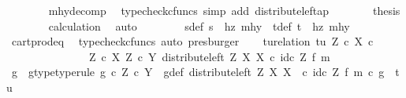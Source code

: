 \begin{isabellebody}
\ \ \ \ \ \ \isamarkupfalse%
\ mhy{\isacharunderscore}{\kern0pt}decomp\ \isamarkupfalse%
\ {\isacharparenleft}{\kern0pt}typecheck{\isacharunderscore}{\kern0pt}cfuncs{\isacharcomma}{\kern0pt}\ simp\ add{\isacharcolon}{\kern0pt}\ distribute{\isacharunderscore}{\kern0pt}left{\isacharunderscore}{\kern0pt}ap{\isacharparenright}{\kern0pt}\isanewline
\ \ \ \ \isamarkupfalse%
\ \isamarkupfalse%
\ {\isacharquery}{\kern0pt}thesis\isanewline
\ \ \ \ \ \ \isamarkupfalse%
\ calculation\ \isamarkupfalse%
\ auto\isanewline
\ \ \isamarkupfalse%
\isanewline
\ \ \isamarkupfalse%
\ \isamarkupfalse%
\ s{\isacharunderscore}{\kern0pt}def{\isacharcolon}{\kern0pt}\ {\isachardoublequoteopen}s\ {\isacharequal}{\kern0pt}\ {\isasymlangle}hz{\isacharcomma}{\kern0pt}\ mhy{}{\isasymrangle}{\isachardoublequoteclose}\ \ t{\isacharunderscore}{\kern0pt}def{\isacharcolon}{\kern0pt}\ {\isachardoublequoteopen}t\ {\isacharequal}{\kern0pt}\ {\isasymlangle}hz{\isacharcomma}{\kern0pt}\ mhy{}{\isasymrangle}{\isachardoublequoteclose}\isanewline
\ \ \ \ \isamarkupfalse%
\ cart{\isacharunderscore}{\kern0pt}prod{\isacharunderscore}{\kern0pt}eq{}\ \isamarkupfalse%
\ {\isacharparenleft}{\kern0pt}typecheck{\isacharunderscore}{\kern0pt}cfuncs{\isacharcomma}{\kern0pt}\ auto{\isacharcomma}{\kern0pt}\ presburger{\isacharparenright}{\kern0pt}\isanewline
\isanewline
\ \ \isamarkupfalse%
\ tu{\isacharunderscore}{\kern0pt}relation{\isacharcolon}{\kern0pt}\ {\isachardoublequoteopen}{\isasymlangle}t{\isacharcomma}{\kern0pt}u{\isasymrangle}\ {\isasymin}\isactrlbsub {\isacharparenleft}{\kern0pt}Z\ {\isasymtimes}\isactrlsub c\ X{\isacharparenright}{\kern0pt}\ {\isasymtimes}\isactrlsub c\isanewline
\ \ \ \ \ \ \ \ \ \ \ \ \ \ \ Z\ {\isasymtimes}\isactrlsub c\ X\isactrlesub \ {\isacharparenleft}{\kern0pt}Z\ {\isasymtimes}\isactrlsub c\ Y{\isacharcomma}{\kern0pt}\ distribute{\isacharunderscore}{\kern0pt}left\ Z\ X\ X\ {\isasymcirc}\isactrlsub c\ id\isactrlsub c\ Z\ {\isasymtimes}\isactrlsub f\ m{\isacharparenright}{\kern0pt}{\isachardoublequoteclose}\isanewline
\ \ \isamarkupfalse%
\ \isamarkupfalse%
\ g\ \ g{\isacharunderscore}{\kern0pt}type{\isacharbrackleft}{\kern0pt}type{\isacharunderscore}{\kern0pt}rule{\isacharbrackright}{\kern0pt}{\isacharcolon}{\kern0pt}\ {\isachardoublequoteopen}g\ {\isasymin}\isactrlsub c\ Z\ {\isasymtimes}\isactrlsub c\ Y{\isachardoublequoteclose}\ \ g{\isacharunderscore}{\kern0pt}def{\isacharcolon}{\kern0pt}\ {\isachardoublequoteopen}{\isacharparenleft}{\kern0pt}distribute{\isacharunderscore}{\kern0pt}left\ Z\ X\ X\ \ {\isasymcirc}\isactrlsub c\ id\isactrlsub c\ Z\ {\isasymtimes}\isactrlsub f\ m{\isacharparenright}{\kern0pt}\ {\isasymcirc}\isactrlsub c\ g\ {\isacharequal}{\kern0pt}\ {\isasymlangle}t{\isacharcomma}{\kern0pt}u{\isasymrangle}{\isachardoublequoteclose}\isanewline

\end{isabellebody}
